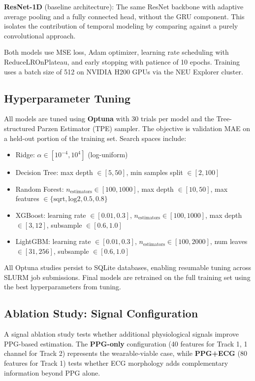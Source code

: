 \documentclass[11pt]{article}
\begin{document}
\textbf{ResNet-1D} (baseline architecture): The same ResNet backbone with adaptive average pooling and a fully connected head, without the GRU component. This isolates the contribution of temporal modeling by comparing against a purely convolutional approach.

Both models use MSE loss, Adam optimizer, learning rate scheduling with ReduceLROnPlateau, and early stopping with patience of 10 epochs. Training uses a batch size of 512 on NVIDIA H200 GPUs via the NEU Explorer cluster.

\subsection{Hyperparameter Tuning}

All models are tuned using \textbf{Optuna} \citep{akiba2019optuna} with 30 trials per model and the Tree-structured Parzen Estimator (TPE) sampler. The objective is validation MAE on a held-out portion of the training set. Search spaces include:

\begin{itemize}[nosep]
    \item Ridge: $\alpha \in [10^{-4}, 10^{4}]$ (log-uniform)
    \item Decision Tree: max depth $\in [5, 50]$, min samples split $\in [2, 100]$
    \item Random Forest: $n_\text{estimators} \in [100, 1000]$, max depth $\in [10, 50]$, max features $\in \{\text{sqrt}, \text{log2}, 0.5, 0.8\}$
    \item XGBoost: learning rate $\in [0.01, 0.3]$, $n_\text{estimators} \in [100, 1000]$, max depth $\in [3, 12]$, subsample $\in [0.6, 1.0]$
    \item LightGBM: learning rate $\in [0.01, 0.3]$, $n_\text{estimators} \in [100, 2000]$, num leaves $\in [31, 256]$, subsample $\in [0.6, 1.0]$
\end{itemize}

All Optuna studies persist to SQLite databases, enabling resumable tuning across SLURM job submissions. Final models are retrained on the full training set using the best hyperparameters from tuning.

\subsection{Ablation Study: Signal Configuration}

A signal ablation study tests whether additional physiological signals improve PPG-based estimation. The \textbf{PPG-only} configuration (40 features for Track 1, 1 channel for Track 2) represents the wearable-viable case, while \textbf{PPG+ECG} (80 features for Track 1) tests whether ECG morphology adds complementary information beyond PPG alone.
\end{document}
